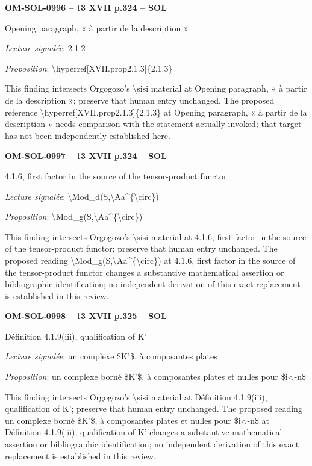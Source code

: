 \par\noindent\textbf{OM-SOL-0996 -- t3 XVII p.324 -- SOL}\par
Opening paragraph, « à partir de la description »\par
\emph{Lecture signalée}: 2.1.2\par
\emph{Proposition}: \textbackslash{}hyperref[XVII.prop2.1.3]\{2.1.3\}\par
This finding intersects Orgogozo's \textbackslash{}sisi material at Opening paragraph, « à partir de la description »; preserve that human entry unchanged. The proposed reference \textbackslash{}hyperref[XVII.prop2.1.3]\{2.1.3\} at Opening paragraph, « à partir de la description » needs comparison with the statement actually invoked; that target has not been independently established here.\par
\par\noindent\textbf{OM-SOL-0997 -- t3 XVII p.324 -- SOL}\par
4.1.6, first factor in the source of the tensor-product functor\par
\emph{Lecture signalée}: \textbackslash{}Mod\_d(S,\textbackslash{}Aa\textasciicircum{}\{\textbackslash{}circ\})\par
\emph{Proposition}: \textbackslash{}Mod\_g(S,\textbackslash{}Aa\textasciicircum{}\{\textbackslash{}circ\})\par
This finding intersects Orgogozo's \textbackslash{}sisi material at 4.1.6, first factor in the source of the tensor-product functor; preserve that human entry unchanged. The proposed reading \textbackslash{}Mod\_g(S,\textbackslash{}Aa\textasciicircum{}\{\textbackslash{}circ\}) at 4.1.6, first factor in the source of the tensor-product functor changes a substantive mathematical assertion or bibliographic identification; no independent derivation of this exact replacement is established in this review.\par
\par\noindent\textbf{OM-SOL-0998 -- t3 XVII p.325 -- SOL}\par
Définition 4.1.9(iii), qualification of K'\par
\emph{Lecture signalée}: un complexe \$K'\$, à composantes plates\par
\emph{Proposition}: un complexe borné \$K'\$, à composantes plates et nulles pour \$i<-n\$\par
This finding intersects Orgogozo's \textbackslash{}sisi material at Définition 4.1.9(iii), qualification of K'; preserve that human entry unchanged. The proposed reading un complexe borné \$K'\$, à composantes plates et nulles pour \$i<-n\$ at Définition 4.1.9(iii), qualification of K' changes a substantive mathematical assertion or bibliographic identification; no independent derivation of this exact replacement is established in this review.\par
